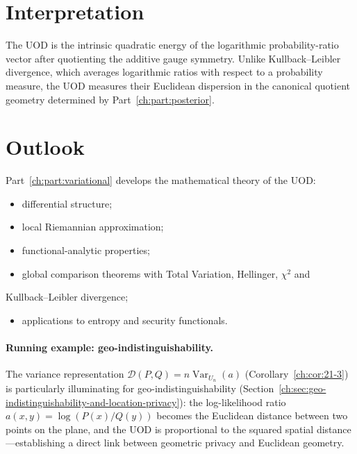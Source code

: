 \section{Interpretation}\label{ch:sec:interpretation}
The UOD is the intrinsic quadratic energy of the logarithmic
probability-ratio vector after quotienting the additive gauge symmetry.
Unlike Kullback--Leibler divergence, which averages logarithmic ratios
with respect to a probability measure, the UOD measures their Euclidean
dispersion in the canonical quotient geometry determined by Part~\ref{ch:part:posterior}.
\section{Outlook}\label{ch:sec:outlook}
Part~\ref{ch:part:variational} develops the mathematical theory of the UOD:
\begin{itemize}
  \item differential structure;\label{ch:sec:differential-uod}
  \item local Riemannian approximation;
  \item functional-analytic properties;\label{ch:sec:functional-uod}
  \item global comparison theorems with Total Variation, Hellinger, $\chi^2$ and
\end{itemize}
    Kullback--Leibler divergence;
\begin{itemize}
  \item applications to entropy and security functionals.
\end{itemize}


\paragraph{Running example: geo-indistinguishability.}
The variance representation $\mathcal D(P,Q)=n\operatorname{Var}_{U_n}(a)$ (Corollary~\ref{ch:cor:21-3}) is particularly illuminating for geo-indistinguishability (Section~\ref{ch:sec:geo-indistinguishability-and-location-privacy}): the log-likelihood ratio $a(x,y)=\log(P(x)/Q(y))$ becomes the Euclidean distance between two points on the plane, and the UOD is proportional to the squared spatial distance---establishing a direct link between geometric privacy and Euclidean geometry.

